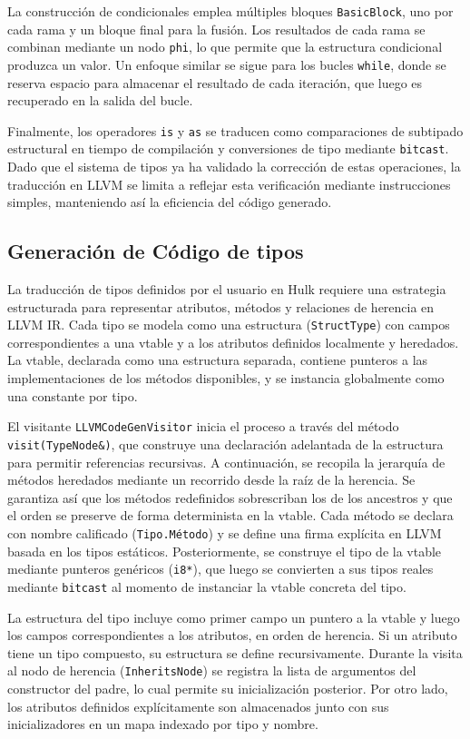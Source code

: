 \documentclass{llncs}
\begin{document}
	La construcción de condicionales emplea múltiples bloques \texttt{BasicBlock}, uno por cada rama y un bloque final para la fusión. Los resultados de cada rama se combinan mediante un nodo \texttt{phi}, lo que permite que la estructura condicional produzca un valor. Un enfoque similar se sigue para los bucles \texttt{while}, donde se reserva espacio para almacenar el resultado de cada iteración, que luego es recuperado en la salida del bucle.

	Finalmente, los operadores \texttt{is} y \texttt{as} se traducen como comparaciones de subtipado estructural en tiempo de compilación y conversiones de tipo mediante \texttt{bitcast}. Dado que el sistema de tipos ya ha validado la corrección de estas operaciones, la traducción en LLVM se limita a reflejar esta verificación mediante instrucciones simples, manteniendo así la eficiencia del código generado.

	\subsection{Generación de Código de tipos}

	La traducción de tipos definidos por el usuario en Hulk requiere una estrategia estructurada para representar atributos, métodos y relaciones de herencia en LLVM IR. Cada tipo se modela como una estructura (\texttt{StructType}) con campos correspondientes a una vtable y a los atributos definidos localmente y heredados. La vtable, declarada como una estructura separada, contiene punteros a las implementaciones de los métodos disponibles, y se instancia globalmente como una constante por tipo.

	El visitante \texttt{LLVMCodeGenVisitor} inicia el proceso a través del método \texttt{visit(TypeNode\&)}, que construye una declaración adelantada de la estructura para permitir referencias recursivas. A continuación, se recopila la jerarquía de métodos heredados mediante un recorrido desde la raíz de la herencia. Se garantiza así que los métodos redefinidos sobrescriban los de los ancestros y que el orden se preserve de forma determinista en la vtable. Cada método se declara con nombre calificado (\texttt{Tipo.Método}) y se define una firma explícita en LLVM basada en los tipos estáticos. Posteriormente, se construye el tipo de la vtable mediante punteros genéricos (\texttt{i8*}), que luego se convierten a sus tipos reales mediante \texttt{bitcast} al momento de instanciar la vtable concreta del tipo.

	La estructura del tipo incluye como primer campo un puntero a la vtable y luego los campos correspondientes a los atributos, en orden de herencia. Si un atributo tiene un tipo compuesto, su estructura se define recursivamente. Durante la visita al nodo de herencia (\texttt{InheritsNode}) se registra la lista de argumentos del constructor del padre, lo cual permite su inicialización posterior. Por otro lado, los atributos definidos explícitamente son almacenados junto con sus inicializadores en un mapa indexado por tipo y nombre.
\end{document}
